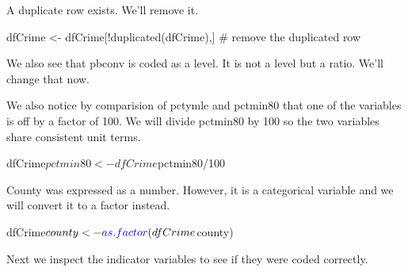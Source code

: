\documentclass[]{article}
\newenvironment{Shaded}{}{}
\newcommand{\CommentTok}[1]{\textcolor[rgb]{0.00,0.50,0.00}{#1}}
\newcommand{\DecValTok}[1]{#1}
\newcommand{\KeywordTok}[1]{\textcolor[rgb]{0.00,0.00,1.00}{#1}}
\newcommand{\NormalTok}[1]{#1}
\newcommand{\OperatorTok}[1]{#1}
\newcommand{\StringTok}[1]{\textcolor[rgb]{0.00,0.50,0.50}{#1}}
\begin{document}
A duplicate row exists. We'll remove it.

\begin{Shaded}
\begin{Highlighting}[]
\NormalTok{dfCrime <-}\StringTok{ }\NormalTok{dfCrime[}\OperatorTok{!}\KeywordTok{duplicated}\NormalTok{(dfCrime),] }\CommentTok{# remove the duplicated row}
\end{Highlighting}
\end{Shaded}

We also see that pbconv is coded as a level. It is not a level but a
ratio. We'll change that now.

\begin{Shaded}
\end{Shaded}

We also notice by comparision of pctymle and pctmin80 that one of the
variables is off by a factor of 100. We will divide pctmin80 by 100 so
the two variables share consistent unit terms.

\begin{Shaded}
\begin{Highlighting}[]
\NormalTok{dfCrime}\OperatorTok{$}\NormalTok{pctmin80<-dfCrime}\OperatorTok{$}\NormalTok{pctmin80}\OperatorTok{/}\DecValTok{100}
\end{Highlighting}
\end{Shaded}

County was expressed as a number. However, it is a categorical variable
and we will convert it to a factor instead.

\begin{Shaded}
\begin{Highlighting}[]
\NormalTok{dfCrime}\OperatorTok{$}\NormalTok{county<-}\KeywordTok{as.factor}\NormalTok{(dfCrime}\OperatorTok{$}\NormalTok{county)}
\end{Highlighting}
\end{Shaded}

Next we inspect the indicator variables to see if they were coded
correctly.

\begin{Shaded}
\end{Shaded}
\end{document}
